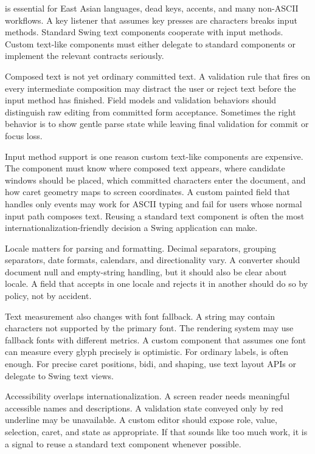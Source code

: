  is essential for East Asian languages, dead keys, accents, and many non-ASCII workflows. A key listener that assumes key presses are characters breaks input methods. Standard Swing text components cooperate with input methods. Custom text-like components must either delegate to standard components or implement the relevant contracts seriously.

Composed text is not yet ordinary committed text. A validation rule that fires on every intermediate composition may distract the user or reject text before the input method has finished. Field models and validation behaviors should distinguish raw editing from committed form acceptance. Sometimes the right behavior is to show gentle parse state while leaving final validation for commit or focus loss.

Input method support is one reason custom text-like components are expensive.
The component must know where composed text appears, where candidate windows
should be placed, which committed characters enter the document, and how caret
geometry maps to screen coordinates. A custom painted field that handles only
 events may work for ASCII typing and fail for users whose normal
input path composes text. Reusing a standard text component is often the most
internationalization-friendly decision a Swing application can make.

Locale matters for parsing and formatting. Decimal separators, grouping separators, date formats, calendars, and directionality vary. A converter should document null and empty-string handling, but it should also be clear about locale. A field that accepts  in one locale and rejects it in another should do so by policy, not by accident.

Text measurement also changes with font fallback. A string may contain characters not supported by the primary font. The rendering system may use fallback fonts with different metrics. A custom component that assumes one font can measure every glyph precisely is optimistic. For ordinary labels,  is often enough. For precise caret positions, bidi, and shaping, use text layout APIs or delegate to Swing text views.

Accessibility overlaps internationalization. A screen reader needs meaningful accessible names and descriptions. A validation state conveyed only by red underline may be unavailable. A custom editor should expose role, value, selection, caret, and state as appropriate. If that sounds like too much work, it is a signal to reuse a standard text component whenever possible.

